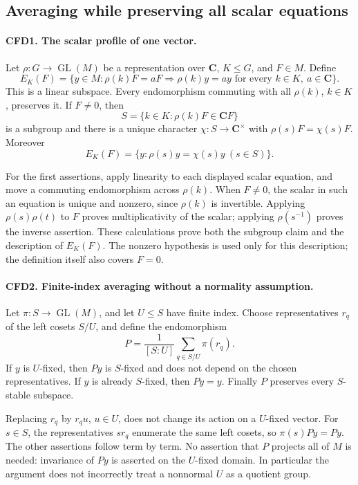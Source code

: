 \subsection{Averaging while preserving all scalar equations}

\paragraph{CFD1. The scalar profile of one vector.}
\label{claim:CFD1}
Let \(\rho:G\to\operatorname{GL}(M)\) be a representation over
\(\mathbf C\), \(K\le G\), and \(F\in M\).  Define
\[
 E_K(F)=\{y\in M: \rho(k)F=aF\Longrightarrow \rho(k)y=ay
                       \text{ for every }k\in K,\ a\in\mathbf C\}.
\]
This is a linear subspace.  Every endomorphism commuting with all
\(\rho(k)\), \(k\in K\), preserves it.  If \(F\ne0\), then
\[
 S=\{k\in K:\rho(k)F\in\mathbf C F\}
\]
is a subgroup and there is a unique character
\(\chi:S\to\mathbf C^\times\) with \(\rho(s)F=\chi(s)F\).
Moreover
\[
 E_K(F)=\{y:\rho(s)y=\chi(s)y\ (s\in S)\}.
\]

For the first assertions, apply linearity to each displayed scalar
equation, and move a commuting endomorphism across \(\rho(k)\).
When \(F\ne0\), the scalar in such an equation is unique and nonzero,
since \(\rho(k)\) is invertible.  Applying \(\rho(s)\rho(t)\) to
\(F\) proves multiplicativity of the scalar; applying \(\rho(s^{-1})\)
proves the inverse assertion.  These calculations prove both the subgroup
claim and the description of \(E_K(F)\).  The nonzero hypothesis is used
only for this description; the definition itself also covers \(F=0\).

\paragraph{CFD2. Finite-index averaging without a normality assumption.}
\label{claim:CFD2}
Let \(\pi:S\to\operatorname{GL}(M)\), and let \(U\le S\) have
finite index.  Choose representatives \(r_q\) of the left cosets
\(S/U\), and define the endomorphism
\[
 P=\frac1{[S:U]}\sum_{q\in S/U}\pi(r_q).
\]
If \(y\) is \(U\)-fixed, then \(Py\) is \(S\)-fixed and does not
depend on the chosen representatives.  If \(y\) is already \(S\)-fixed,
then \(Py=y\).  Finally \(P\) preserves every \(S\)-stable subspace.

Replacing \(r_q\) by \(r_qu\), \(u\in U\), does not change its
action on a \(U\)-fixed vector.  For \(s\in S\), the representatives
\(sr_q\) enumerate the same left cosets, so \(\pi(s)Py=Py\).
The other assertions follow term by term.  No assertion that \(P\)
projects all of \(M\) is needed: invariance of \(Py\) is asserted on
the \(U\)-fixed domain.  In particular the argument does not incorrectly
treat a nonnormal \(U\) as a quotient group.

